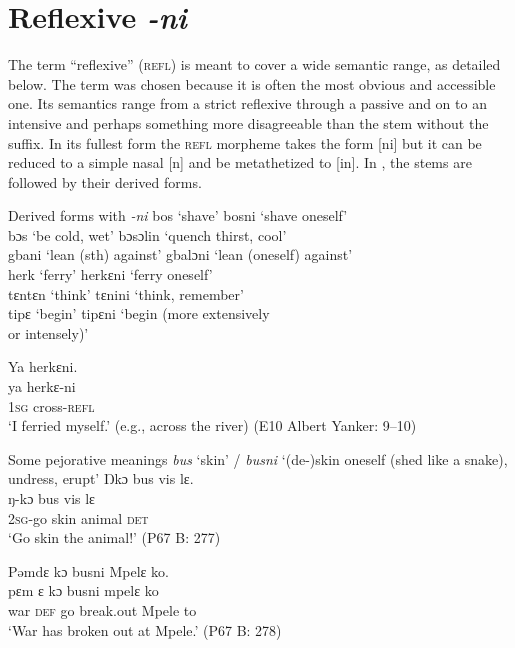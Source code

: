 \section{Reflexive \textit{-ni}}
\label{bkm:Ref521779843}\hypertarget{Toc115517801}{}\label{sec:6.2}
The term “reflexive” (\textsc{refl}) is meant to cover a wide semantic range, as detailed below. The term was chosen because it is often the most obvious and accessible one. Its semantics range from a strict reflexive through a passive and on to an intensive and perhaps something more disagreeable than the stem without the suffix. In its fullest form the \textsc{refl} morpheme takes the form [ni] but it can be reduced to a simple nasal [n] and be metathetized to [in]. In , the stems are followed by their derived forms.


\ea%
    \label{ex:160} Derived forms with \textit{{}-ni}
    \ea bos \tab  ‘shave' \tab bosni \tab  ‘shave oneself'\\
    bɔs \tab  ‘be cold, wet' \tab bɔsɔlin \tab  ‘quench thirst, cool'\\
    gbani \tab  ‘lean (sth) against'  \tab gbalɔni \tab  ‘lean (oneself) against'\\
    herk \tab ‘ferry' \tab herkɛni \tab ‘ferry oneself' \\
  
    tɛntɛn \tab ‘think' \tab tɛnini \tab ‘think, remember'\\
    tipɛ \tab ‘begin' \tab  tipɛni \tab ‘begin (more extensively\\ 
    \tab\tab\tab or intensely)'\\
    
\vspace{6pt}
 
  \ex Ya herkɛni.\\
    \gll ya  herkɛ-ni\\
    1\textsc{sg} cross\textsc{{}-refl}\\
    \glt ‘I ferried myself.' (e.g., across the river) (E10 Albert Yanker: 9--10)
  \z
\z

\ea%
\label{ex:161}Some pejorative meanings
\ea \textit{bus} ‘skin' / \textit{busni} ‘(de-)skin oneself (shed like a snake), undress, erupt'
  \ea Ŋkɔ bus vis lɛ.\\
  \gll ŋ-kɔ     bus   vis      lɛ\\
  \textsc{2sg}{}-go  skin  animal \textsc{det}\\
  \glt ‘Go skin the animal!' (P67 B: 277)

  \ex Pəmdɛ kɔ busni Mpelɛ ko.\\
  \gll pɛm  ɛ    kɔ    busni     mpelɛ  ko\\
  war  \textsc{def}  go    break.out  Mpele  to\\
  \glt ‘War has broken out at Mpele.' (P67 B: 278)
\z

